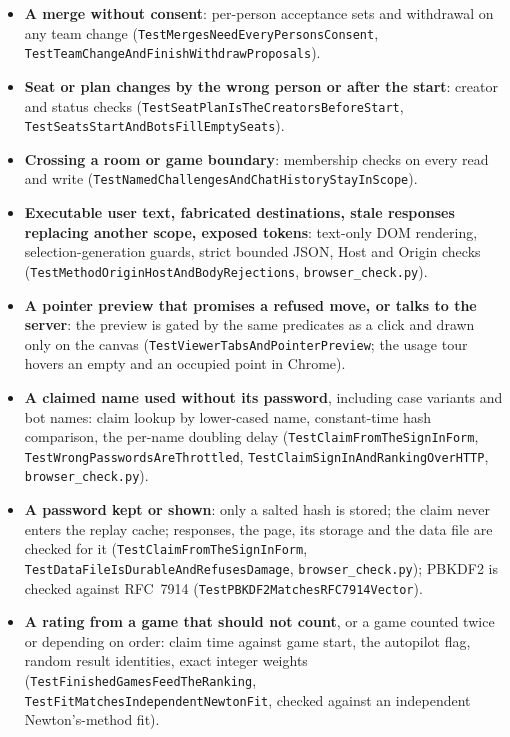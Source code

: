 \documentclass[11pt,oneside]{book}
\begin{document}
\begin{itemize}
  cap, bounded slots (race-enabled \texttt{TestAllBotGamePlaysToTheEnd}).
  \item \textbf{A merge without consent}: per-person acceptance sets and
  withdrawal on any team change (\texttt{TestMergesNeedEveryPersonsConsent},
  \texttt{TestTeamChangeAndFinishWithdrawProposals}).
  \item \textbf{Seat or plan changes by the wrong person or after the start}:
  creator and status checks (\texttt{TestSeatPlanIsTheCreatorsBeforeStart},
  \texttt{TestSeatsStartAndBotsFillEmptySeats}).
  \item \textbf{Crossing a room or game boundary}: membership checks on every
  read and write (\texttt{TestNamedChallengesAndChatHistoryStayInScope}).
  \item \textbf{Executable user text, fabricated destinations, stale responses
  replacing another scope, exposed tokens}: text-only DOM rendering,
  selection-generation guards, strict bounded JSON, Host and Origin checks
  (\texttt{TestMethodOriginHostAndBodyRejections}, \texttt{browser\_check.py}).
  \item \textbf{A pointer preview that promises a refused move, or talks to
  the server}: the preview is gated by the same predicates as a click and drawn
  only on the canvas (\texttt{TestViewerTabsAndPointerPreview}; the usage tour
  hovers an empty and an occupied point in Chrome).
  \item \textbf{A claimed name used without its password}, including case
  variants and bot names: claim lookup by lower-cased name, constant-time hash
  comparison, the per-name doubling delay (\texttt{TestClaimFromTheSignInForm},
  \texttt{TestWrongPasswordsAreThrottled}, \texttt{TestClaimSignInAndRankingOverHTTP},
  \texttt{browser\_check.py}).
  \item \textbf{A password kept or shown}: only a salted hash is stored; the
  claim never enters the replay cache; responses, the page, its storage and the
  data file are checked for it (\texttt{TestClaimFromTheSignInForm},
  \texttt{TestDataFileIsDurableAndRefusesDamage}, \texttt{browser\_check.py});
  PBKDF2 is checked against RFC~7914 (\texttt{TestPBKDF2MatchesRFC7914Vector}).
  \item \textbf{A rating from a game that should not count}, or a game counted
  twice or depending on order: claim time against game start, the autopilot
  flag, random result identities, exact integer weights
  (\texttt{TestFinishedGamesFeedTheRanking}, \texttt{TestFitMatchesIndependentNewtonFit},
  checked against an independent Newton's-method fit).

\end{itemize}
\end{document}

